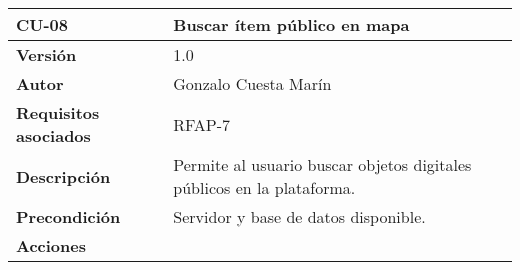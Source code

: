 \begin{longtable}[]{@{}ll@{}}
\toprule
\begin{minipage}[b]{0.20\columnwidth}\raggedright
\textbf{CU-08}\strut
\end{minipage} & \begin{minipage}[b]{0.74\columnwidth}\raggedright
\textbf{Buscar ítem público en mapa}\strut
\end{minipage}\tabularnewline
\midrule
\endhead
\begin{minipage}[t]{0.20\columnwidth}\raggedright
\textbf{Versión}\strut
\end{minipage} & \begin{minipage}[t]{0.74\columnwidth}\raggedright
1.0\strut
\end{minipage}\tabularnewline
\begin{minipage}[t]{0.20\columnwidth}\raggedright
\textbf{Autor}\strut
\end{minipage} & \begin{minipage}[t]{0.74\columnwidth}\raggedright
Gonzalo Cuesta Marín\strut
\end{minipage}\tabularnewline
\begin{minipage}[t]{0.20\columnwidth}\raggedright
\textbf{Requisitos asociados}\strut
\end{minipage} & \begin{minipage}[t]{0.74\columnwidth}\raggedright
RFAP-7\strut
\end{minipage}\tabularnewline
\begin{minipage}[t]{0.20\columnwidth}\raggedright
\textbf{Descripción}\strut
\end{minipage} & \begin{minipage}[t]{0.74\columnwidth}\raggedright
Permite al usuario buscar objetos digitales públicos en la
plataforma.\strut
\end{minipage}\tabularnewline
\begin{minipage}[t]{0.20\columnwidth}\raggedright
\textbf{Precondición}\strut
\end{minipage} & \begin{minipage}[t]{0.74\columnwidth}\raggedright
Servidor y base de datos disponible.\strut
\end{minipage}\tabularnewline
\begin{minipage}[t]{0.20\columnwidth}\raggedright
\textbf{Acciones}\strut
\end{minipage} & \begin{minipage}[t]{0.74\columnwidth}\raggedright
\begin{enumerate}

\end{enumerate}
\end{minipage}
\end{longtable}

